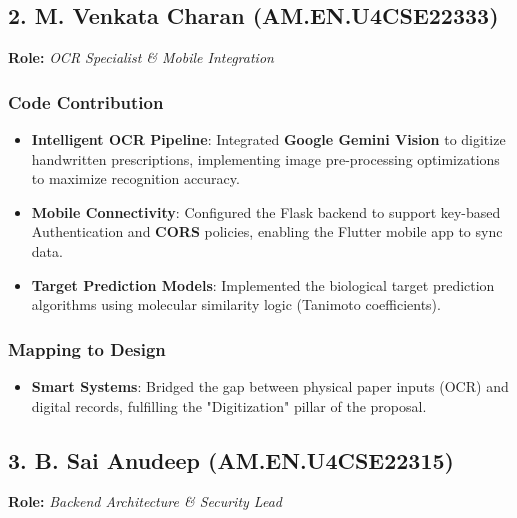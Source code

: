 \documentclass[a4paper,12pt]{article}
\begin{document}
\hrulefill

\subsection*{2. M. Venkata Charan (AM.EN.U4CSE22333)}
\textbf{Role:} \textit{OCR Specialist \& Mobile Integration}

\subsubsection*{Code Contribution}
\begin{itemize}
    \item \textbf{Intelligent OCR Pipeline}: Integrated \textbf{Google Gemini Vision} to digitize handwritten prescriptions, implementing image pre-processing optimizations to maximize recognition accuracy.
    \item \textbf{Mobile Connectivity}: Configured the Flask backend to support key-based Authentication and \textbf{CORS} policies, enabling the Flutter mobile app to sync data.
    \item \textbf{Target Prediction Models}: Implemented the biological target prediction algorithms using molecular similarity logic (Tanimoto coefficients).
\end{itemize}

\subsubsection*{Mapping to Design}
\begin{itemize}
    \item \textbf{Smart Systems}: Bridged the gap between physical paper inputs (OCR) and digital records, fulfilling the "Digitization" pillar of the proposal.
\end{itemize}

\hrulefill

\subsection*{3. B. Sai Anudeep (AM.EN.U4CSE22315)}
\textbf{Role:} \textit{Backend Architecture & Security Lead}
\end{document}
